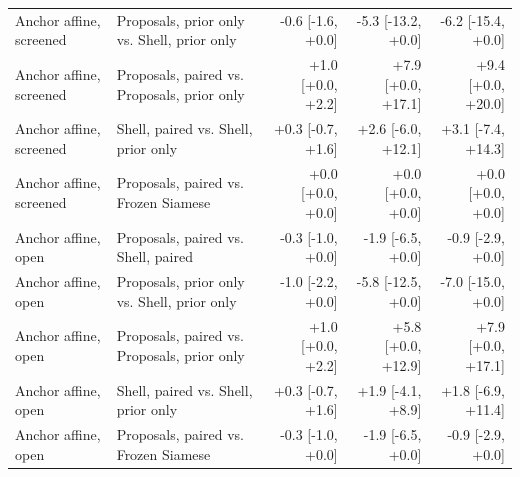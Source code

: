 \begin{tabular}{@{}llrrr@{}}
Anchor affine, screened & Proposals, prior only vs. Shell, prior only & -0.6 [-1.6, +0.0] & -5.3 [-13.2, +0.0] & -6.2 [-15.4, +0.0] \\
Anchor affine, screened & Proposals, paired vs. Proposals, prior only & +1.0 [+0.0, +2.2] & +7.9 [+0.0, +17.1] & +9.4 [+0.0, +20.0] \\
Anchor affine, screened & Shell, paired vs. Shell, prior only & +0.3 [-0.7, +1.6] & +2.6 [-6.0, +12.1] & +3.1 [-7.4, +14.3] \\
Anchor affine, screened & Proposals, paired vs. Frozen Siamese & +0.0 [+0.0, +0.0] & +0.0 [+0.0, +0.0] & +0.0 [+0.0, +0.0] \\
Anchor affine, open & Proposals, paired vs. Shell, paired & -0.3 [-1.0, +0.0] & -1.9 [-6.5, +0.0] & -0.9 [-2.9, +0.0] \\
Anchor affine, open & Proposals, prior only vs. Shell, prior only & -1.0 [-2.2, +0.0] & -5.8 [-12.5, +0.0] & -7.0 [-15.0, +0.0] \\
Anchor affine, open & Proposals, paired vs. Proposals, prior only & +1.0 [+0.0, +2.2] & +5.8 [+0.0, +12.9] & +7.9 [+0.0, +17.1] \\
Anchor affine, open & Shell, paired vs. Shell, prior only & +0.3 [-0.7, +1.6] & +1.9 [-4.1, +8.9] & +1.8 [-6.9, +11.4] \\
Anchor affine, open & Proposals, paired vs. Frozen Siamese & -0.3 [-1.0, +0.0] & -1.9 [-6.5, +0.0] & -0.9 [-2.9, +0.0] \\
\bottomrule
\end{tabular}

